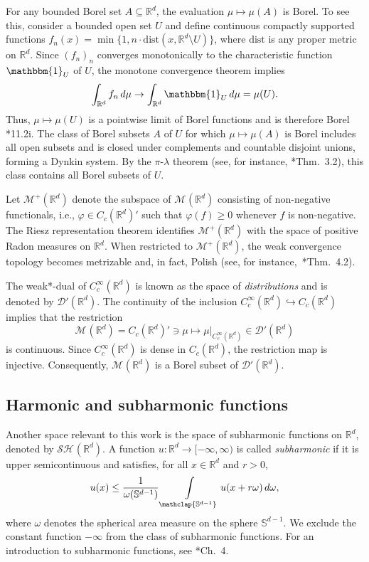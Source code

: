\documentclass[12pt]{paper}
\numberwithin{equation}{section}
\theoremstyle{plain}
\theoremstyle{definition}
\newcommand{\bbone}{\mathbbm{1}}
\newcommand{\Rd}{\mathbb{R}^{d}}
\renewcommand{\S}{\mathbb{S}}
\newcommand{\contcs}[1]{C_{c}(#1)}
\newcommand{\smoothcs}[1]{C^{\infty}_{c}(#1)}
\newcommand{\meas}[2][]{\mathcal{M}_{#1}(#2)}
\newcommand{\measp}[2][]{\mathcal{M}_{#1}^+(#2)}
\newcommand{\distrib}[1]{\mathscr{D}'(#1)}
\newcommand{\sharm}[2][]{\mathcal{SH}_{#1}(#2)}
\newcommand{\dist}{\textrm{dist}}
\renewcommand{\phi}{\varphi}
\begin{document}
For any bounded Borel set \(A \subseteq \Rd\), the evaluation \(\mu \mapsto \mu(A)\) is Borel.  To
see this, consider a bounded open set \(U\) and define continuous compactly supported functions
\(f_{n}(x) = \min\{1, n\cdot \dist(x, \Rd \setminus U)\}\), where \(\dist\) is any proper metric on
\(\Rd\).  Since \((f_{n})_{n}\) converges monotonically to the characteristic function
\(\bbone_{U}\) of \(U\), the monotone convergence theorem implies
\[ \int_{\Rd} f_{n}\, d\mu \to \int_{\Rd} \bbone_{U}\, d\mu = \mu(U). \]  Thus,
\(\mu \mapsto \mu(U)\) is a pointwise limit of Borel functions and is therefore Borel
\cite{Kechris}*{11.2i}.  The class of Borel subsets \(A\) of \(U\) for which \(\mu \mapsto \mu(A)\)
is Borel includes all open subsets and is closed under complements and countable disjoint unions,
forming a Dynkin system.  By the \(\pi\)-\(\lambda\) theorem (see, for instance,
\cite{Billingsley1995-wf}*{Thm.~3.2}), this class contains all Borel subsets of \(U\).

Let \(\measp{\Rd}\) denote the subspace of \(\meas{\Rd}\) consisting of non-negative functionals,
i.e., \(\phi \in \contcs{\Rd}'\) such that \(\phi(f) \ge 0\) whenever \(f\) is non-negative.  The
Riesz representation theorem identifies \(\measp{\Rd}\) with the space of positive Radon measures on
\(\Rd\).  When restricted to \(\measp{\Rd}\), the weak convergence topology becomes metrizable and,
in fact, Polish (see, for instance,~\cite{kallenbergRandomMeasuresTheory2017}*{Thm.~4.2}).

The weak*-dual of \(\smoothcs{\Rd}\) is known as the space of \emph{distributions} and is denoted by
\(\distrib{\Rd}\).  The continuity of the inclusion \(\smoothcs{\Rd} \hookrightarrow \contcs{\Rd}\)
implies that the restriction
\[
\meas{\Rd} = \contcs{\Rd}' \ni \mu \mapsto \mu|_{\smoothcs{\Rd}} \in \distrib{\Rd}
\]
is continuous.  Since \(\smoothcs{\Rd}\) is dense in \(\contcs{\Rd}\), the restriction map is
injective.  Consequently, \(\meas{\Rd}\) is a Borel subset of \(\distrib{\Rd}\).


\subsection{Harmonic and subharmonic functions}
\label{sec:subh-funct}

Another space relevant to this work is the space of subharmonic functions on \(\Rd\), denoted by
\(\sharm{\Rd}\).  A function \(u : \Rd \to [-\infty, \infty)\) is called \emph{subharmonic} if it is
upper semicontinuous and satisfies, for all \(x\in \Rd\) and \(r > 0\),
\begin{equation}
  \label{eq:subharmonic}
  u(x) \le \frac{1}{\omega(\S^{d-1})}
  \int\limits_{\mathclap{\S^{d-1}}} u(x + r\omega)\, d\omega,
\end{equation}
where \(\omega\) denotes the spherical area measure on the sphere \(\S^{d-1}\).  We exclude the
constant function \(-\infty\) from the class of subharmonic functions.  For an introduction to
subharmonic functions, see \cite{hormanderAnalysisLinearPartial2003}*{Ch.~4}.
\end{document}
